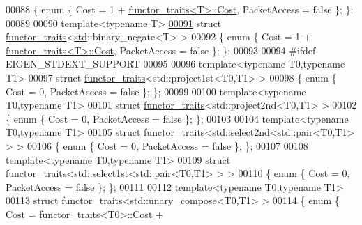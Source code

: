 \begin{DoxyCode}
00088 \{ \textcolor{keyword}{enum} \{ Cost = 1 + \hyperlink{struct_eigen_1_1internal_1_1functor__traits}{functor\_traits<T>::Cost}, PacketAccess = \textcolor{keyword}{false} \}; \};
00089 
00090 \textcolor{keyword}{template}<\textcolor{keyword}{typename} T>
\hyperlink{struct_eigen_1_1internal_1_1functor__traits_3_01std_1_1binary__negate_3_01_t_01_4_01_4}{00091} \textcolor{keyword}{struct }\hyperlink{struct_eigen_1_1internal_1_1functor__traits}{functor\_traits}<\hyperlink{namespacestd}{std}::binary\_negate<T> >
00092 \{ \textcolor{keyword}{enum} \{ Cost = 1 + \hyperlink{struct_eigen_1_1internal_1_1functor__traits}{functor\_traits<T>::Cost}, PacketAccess = \textcolor{keyword}{false} \}; \};
00093 
00094 \textcolor{preprocessor}{#ifdef EIGEN\_STDEXT\_SUPPORT}
00095 
00096 \textcolor{keyword}{template}<\textcolor{keyword}{typename} T0,\textcolor{keyword}{typename} T1>
00097 \textcolor{keyword}{struct }\hyperlink{struct_eigen_1_1internal_1_1functor__traits}{functor\_traits}<std::project1st<T0,T1> >
00098 \{ \textcolor{keyword}{enum} \{ Cost = 0, PacketAccess = \textcolor{keyword}{false} \}; \};
00099 
00100 \textcolor{keyword}{template}<\textcolor{keyword}{typename} T0,\textcolor{keyword}{typename} T1>
00101 \textcolor{keyword}{struct }\hyperlink{struct_eigen_1_1internal_1_1functor__traits}{functor\_traits}<std::project2nd<T0,T1> >
00102 \{ \textcolor{keyword}{enum} \{ Cost = 0, PacketAccess = \textcolor{keyword}{false} \}; \};
00103 
00104 \textcolor{keyword}{template}<\textcolor{keyword}{typename} T0,\textcolor{keyword}{typename} T1>
00105 \textcolor{keyword}{struct }\hyperlink{struct_eigen_1_1internal_1_1functor__traits}{functor\_traits}<std::select2nd<std::pair<T0,T1> > >
00106 \{ \textcolor{keyword}{enum} \{ Cost = 0, PacketAccess = \textcolor{keyword}{false} \}; \};
00107 
00108 \textcolor{keyword}{template}<\textcolor{keyword}{typename} T0,\textcolor{keyword}{typename} T1>
00109 \textcolor{keyword}{struct }\hyperlink{struct_eigen_1_1internal_1_1functor__traits}{functor\_traits}<std::select1st<std::pair<T0,T1> > >
00110 \{ \textcolor{keyword}{enum} \{ Cost = 0, PacketAccess = \textcolor{keyword}{false} \}; \};
00111 
00112 \textcolor{keyword}{template}<\textcolor{keyword}{typename} T0,\textcolor{keyword}{typename} T1>
00113 \textcolor{keyword}{struct }\hyperlink{struct_eigen_1_1internal_1_1functor__traits}{functor\_traits}<std::unary\_compose<T0,T1> >
00114 \{ \textcolor{keyword}{enum} \{ Cost = \hyperlink{struct_eigen_1_1internal_1_1functor__traits}{functor\_traits<T0>::Cost} + 

\end{DoxyCode}
